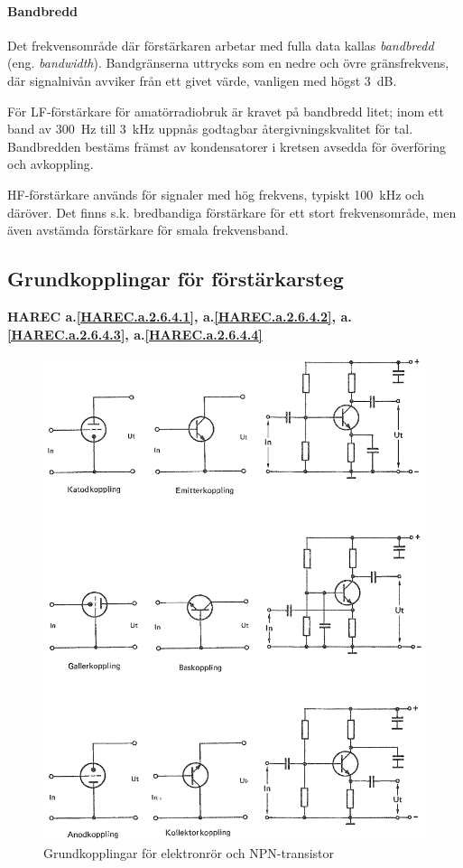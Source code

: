 \paragraph{Bandbredd}

Det frekvensområde där förstärkaren arbetar med fulla data kallas
\emph{bandbredd} (eng. \emph{bandwidth}).
Bandgränserna uttrycks som en nedre och övre gränsfrekvens, där signalnivån
avviker från ett givet värde, vanligen med högst 3~dB.

För LF-förstärkare för amatörradiobruk är kravet på bandbredd litet; inom ett
band av 300~Hz till 3~kHz uppnås godtagbar återgivningskvalitet för tal.
Bandbredden bestäms främst av kondensatorer i kretsen avsedda för överföring
och avkoppling.

HF-förstärkare används för signaler med hög frekvens, typiskt 100~kHz och
däröver.
Det finns s.k. bredbandiga förstärkare för ett stort frekvensområde, men även
avstämda förstärkare för smala frekvensband.

\subsection{Grundkopplingar för förstärkarsteg}
\textbf{HAREC a.\ref{HAREC.a.2.6.4.1}, a.\ref{HAREC.a.2.6.4.2}, a.\ref{HAREC.a.2.6.4.3}, a.\ref{HAREC.a.2.6.4.4}\label{myHAREC.a.2.6.4.1}\label{myHAREC.a.2.6.4.2}\label{myHAREC.a.2.6.4.3}\label{myHAREC.a.2.6.4.4}}

\begin{figure}
\includegraphics[width=\textwidth]{images/cropped_pdfs/bild_2_3-42.pdf}
\caption{Grundkopplingar för elektronrör och NPN-transistor}
\label{fig:BildII3-42}
\end{figure}

